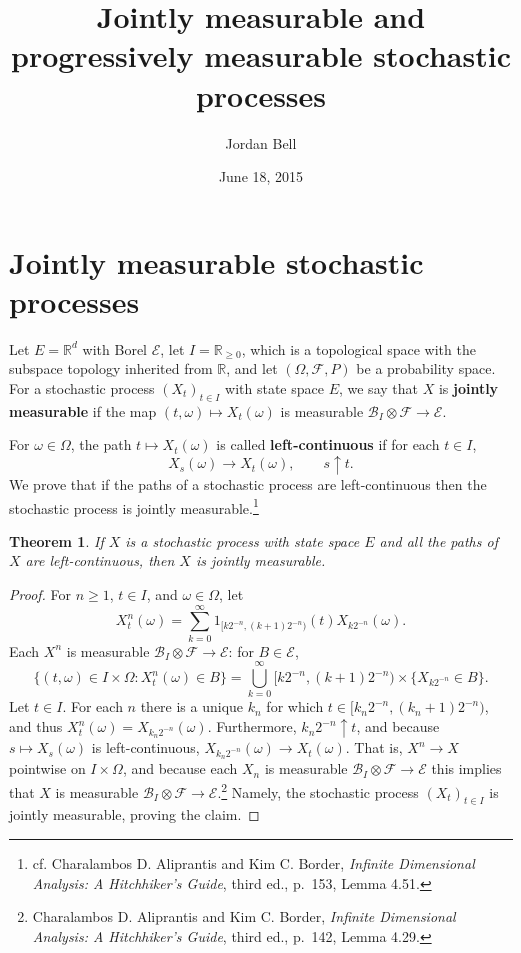 \documentclass{article}
\theoremstyle{plain}
\newtheorem{theorem}{Theorem}
\theoremstyle{definition}
\begin{document}
\title{Jointly measurable and progressively measurable stochastic processes}
\author{Jordan Bell}
\date{June 18, 2015}

\maketitle

\section{Jointly measurable stochastic processes}
Let $E=\mathbb{R}^d$  with Borel $\mathscr{E}$, 
let $I = \mathbb{R}_{\geq 0}$, which is a topological  space with the subspace topology inherited from $\mathbb{R}$,
and let
$(\Omega,\mathscr{F},P)$ be a probability space.
For a stochastic process $(X_t)_{t \in I}$ with state space $E$,
we say that
$X$ is \textbf{jointly measurable} if the map
$(t,\omega) \mapsto X_t(\omega)$ is measurable $\mathscr{B}_I \otimes \mathscr{F} \to \mathscr{E}$. 

For $\omega \in \Omega$, the path $t \mapsto X_t(\omega)$ is called
\textbf{left-continuous} if 
for each $t \in I$,
\[
X_s(\omega) \to X_t(\omega),\qquad s \uparrow t.
\] 
We prove that if the paths of a stochastic process are left-continuous then the stochastic process
is jointly measurable.\footnote{cf. Charalambos D. Aliprantis and Kim C. Border, {\em Infinite Dimensional Analysis:
A Hitchhiker's Guide}, third ed., p.~153, Lemma 4.51.}

\begin{theorem}
If $X$ is a stochastic process with state space $E$ and  all the paths of $X$ are left-continuous, then $X$ is
jointly measurable.
\end{theorem}
\begin{proof}
For $n \geq 1$, $t \in I$, and  $\omega \in \Omega$, let 
\[
X^n_t(\omega) = \sum_{k=0}^\infty 1_{[k2^{-n}, (k+1)2^{-n})}(t) X_{k 2^{-n}}(\omega).
\]
Each $X^n$ is measurable $\mathscr{B}_I \otimes \mathscr{F} \to \mathscr{E}$:
for $B \in \mathscr{E}$,
\[
\{(t,\omega) \in I \times \Omega: X^n_t(\omega) \in B\}
=\bigcup_{k=0}^\infty [k2^{-n},(k+1)2^{-n}) \times \{X_{k2^{-n}} \in B\}.
\]
Let $t \in I$.
For each $n$ there is a unique $k_n$ for which $t \in [k_n2^{-n},(k_n+1)2^{-n})$, and 
thus $X_t^n(\omega) = X_{k_n 2^{-n}}(\omega)$. Furthermore, $k_n2^{-n} \uparrow t$, and because 
 $s \mapsto X_s(\omega)$ is left-continuous,  $X_{k_n 2^{-n}}(\omega) \to X_t(\omega)$.
That is, 
$X^n \to X$ pointwise on $I \times \Omega$, 
and because each $X_n$ is measurable 
$\mathscr{B}_I \otimes \mathscr{F} \to \mathscr{E}$ this implies that
$X$ is measurable $\mathscr{B}_I \otimes \mathscr{F} \to \mathscr{E}$.\footnote{Charalambos D. Aliprantis and Kim C. Border, {\em Infinite Dimensional Analysis:
A Hitchhiker's Guide}, third ed., p.~142, Lemma 4.29.} Namely, the stochastic process $(X_t)_{t \in I}$ is jointly measurable, proving the claim.
\end{proof}
\end{document}
